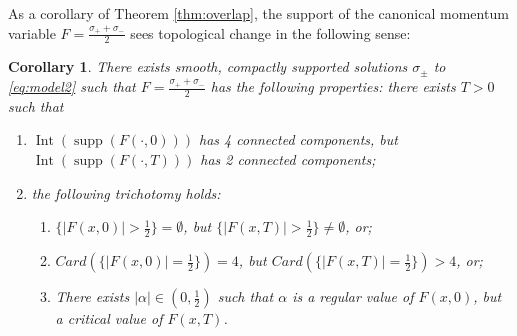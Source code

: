 \documentclass[11pt,reqno]{amsproc}
\newtheorem{cor}{Corollary}
\DeclareMathOperator{\supp}{supp}
\DeclareMathOperator{\Int}{Int}
\begin{document}
As a corollary of Theorem \ref{thm:overlap}, the support of the canonical momentum variable $F = \frac{\sigma_+ + \sigma_-}{2}$ sees topological change in the following sense:
\begin{cor}\label{cor:topo}
    There exists smooth, compactly supported solutions $\sigma_\pm$ to \eqref{eq:model2} such that $F = \frac{\sigma_+ + \sigma_-}{2}$ has the following properties: there exists $T > 0$ such that
    \begin{enumerate}
        \item $\Int(\supp(F(\cdot,0)))$ has 4 connected components, but $\Int(\supp(F(\cdot,T)))$ has 2 connected components;
        \item the following trichotomy holds:
        \begin{enumerate}
            \item $\{|F(x,0)| > \frac12\} = \emptyset$, but $\{|F(x,T)| > \frac12\} \neq \emptyset$, or;
            \item $Card(\{|F(x,0)| = \frac12\}) = 4$, but $Card(\{|F(x,T)| = \frac12\}) > 4$, or;
            \item There exists $|\alpha| \in (0,\frac12)$ such that $\alpha$ is a regular value of $F(x,0)$, but a critical value of $F(x,T)$.
        \end{enumerate}
    \end{enumerate}
\end{cor}
\end{document}

